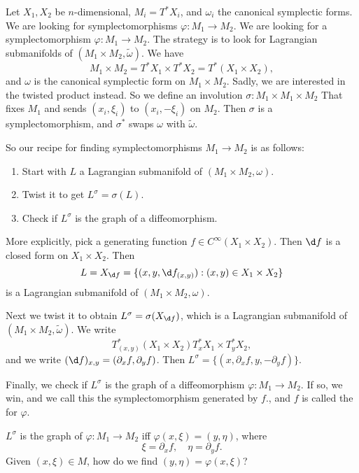 \documentclass[a4paper]{article}
\begin{document}
\begin{eg}
  Let $X_1, X_2$ be $n$-dimensional, $M_i = T^*X_i$, and $\omega_i$ the canonical symplectic forms. We are looking for symplectomorphisms $\varphi: M_1 \to M_2$. We are looking for a symplectomorphism $\varphi: M_1 \to M_2$. The strategy is to look for Lagrangian submanifolds of $(M_1 \times M_2, \tilde{\omega})$. We have
  \[
    M_1 \times M_2 = T^* X_1 \times T^* X_2 = T^*(X_1 \times X_2),
  \]
  and $\omega$ is the canonical symplectic form on $M_1 \times M_2$. Sadly, we are interested in the twisted product instead. So we define an involution $\sigma: M_1 \times M_1 \times M_2$ That fixes $M_1$ and sends $(x_i, \xi_i)$ to $(x_i, -\xi_i)$ on $M_2$. Then $\sigma$ is a symplectomorphism, and $\sigma^*$ swaps $\omega$ with $\tilde{\omega}$.

  So our recipe for finding symplectomorphisms $M_1 \to M_2$ is as follows:
  \begin{enumerate}
    \item Start with $L$ a Lagrangian submanifold of $(M_1 \times M_2, \omega)$.
    \item Twist it to get $L^\sigma = \sigma(L)$.
    \item Check if $L^\sigma$ is the graph of a diffeomorphism.
  \end{enumerate}
  More explicitly, pick a generating function $f \in C^\infty(X_1 \times X_2)$. Then $\d f$ is a closed form on $X_1 \times X_2$. Then
  \[
    L = X_{\d f} = \{(x, y, \d f_{(x, y)}): (x, y) \in X_1 \times X_2\}
  \]
  is a Lagrangian submanifold of $(M_1 \times M_2, \omega)$.

  Next we twist it to obtain $L^\sigma = \sigma(X_{\d f})$, which is a Lagrangian submanifold of $(M_1 \times M_2, \tilde{\omega})$. We write
  \[
    T^*_{(x, y)} (X_1 \times X_2) T_x^* X_1 \times T_y^* X_2,
  \]
  and we write $(\d f)_{x, y} = (\partial_x f, \partial_y f)$. Then $L^\sigma = \{(x, \partial_x f, y, -\partial_y f)\}$.

  Finally, we check if $L^\sigma$ is the graph of a diffeomorphism $\varphi: M_1 \to M_2$. If so, we win, and we call this the symplectomorphism generated by $f$., and $f$ is called the  for $\varphi$.

  $L^\sigma$ is the graph of $\varphi: M_1 \to M_2$ iff $\varphi(x, \xi) = (y, \eta)$, where
  \[
    \xi = \partial_x f,\quad \eta = \partial_y f.
  \]
  Given $(x, \xi) \in M$, how do we find $(y, \eta) = \varphi(x, \xi)$?


\end{eg}
\end{document}
